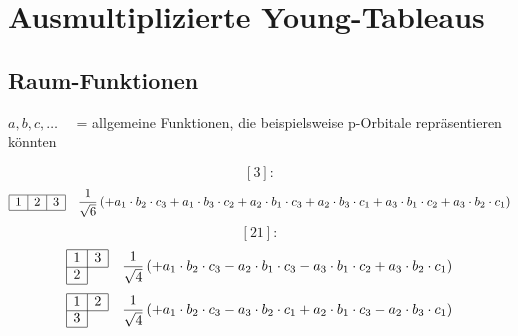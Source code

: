 \documentclass[fleqn]{article}%
\begin{document}
\section{Ausmultiplizierte Young{-}Tableaus}%
\label{sec:AusmultiplizierteYoung{-}Tableaus}%

%
\subsection{Raum{-}Funktionen}%
\label{subsec:Raum{-}Funktionen}%
$a, b, c, \hdots \quad $ = allgemeine Funktionen, die beispielsweise p-Orbitale repräsentieren könnten

%
\vspace{0.25cm}%
\begin{dmath*}\left[3\right]:\end{dmath*}%
\vspace{0.25cm}%
\begin{dmath*}\begin{array}{|c|c|c|} \hline 1 & 2 & 3\\ \cline{1-3} \end{array} \quad \frac{1}{\sqrt{6}} \left( + a_{1} \cdot b_{2} \cdot c_{3}  + a_{1} \cdot b_{3} \cdot c_{2}  + a_{2} \cdot b_{1} \cdot c_{3}  + a_{2} \cdot b_{3} \cdot c_{1}  + a_{3} \cdot b_{1} \cdot c_{2}  + a_{3} \cdot b_{2} \cdot c_{1}\right) \end{dmath*}%
\vspace{0.25cm}%
\vspace{0.25cm}%
\vspace{0.25cm}%
\begin{dmath*}\left[21\right]:\end{dmath*}%
\vspace{0.25cm}%
\begin{dmath*}\begin{array}{|c|c|} \hline 1 & 3\\ \cline{1-2} 2\\ \cline{1-1} \end{array} \quad \frac{1}{\sqrt{4}} \left( + a_{1} \cdot b_{2} \cdot c_{3}  - a_{2} \cdot b_{1} \cdot c_{3}  - a_{3} \cdot b_{1} \cdot c_{2}  + a_{3} \cdot b_{2} \cdot c_{1}\right) \end{dmath*}%
\vspace{0.25cm}%
\begin{dmath*}\begin{array}{|c|c|} \hline 1 & 2\\ \cline{1-2} 3\\ \cline{1-1} \end{array} \quad \frac{1}{\sqrt{4}} \left( + a_{1} \cdot b_{2} \cdot c_{3}  - a_{3} \cdot b_{2} \cdot c_{1}  + a_{2} \cdot b_{1} \cdot c_{3}  - a_{2} \cdot b_{3} \cdot c_{1}\right) \end{dmath*}%
\end{document}
